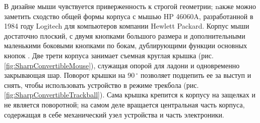 \documentclass[11pt, a4paper]{article}
\begin{document}
В дизайне мыши чувствуется приверженность к строгой геометрии; nакже можно заметить сходство общей формы корпуса с мышью HP 46060A, разработанной в 1984 году Logitech для компьютеров компании Hewlett Packard. Корпус мыши достаточно плоский, с двумя кнопками большого размера и дополнительными маленькими боковыми кнопками по бокам, дублирующими функции основных кнопок \cite{JapaneseVintage}. Две трети корпуса занимает съемная круглая крышка (рис. \ref{fig:SharpConvertibleMouse}), служащая опорой для ладони и одновременно закрывающая шар. Поворот крышки на 90\,$^\circ$ позволяет подцепить ее за выступ и снять, чтобы использовать устройство в режиме трекбола (рис. \ref{fig:SharpConvertibleTrackball}). Сама крышка крепится к корпусу на защелках и не является поворотной; на самом деле вращается центральная часть корпуса, содержащая в себе механический узел устройства и часть электроники.
\end{document}
